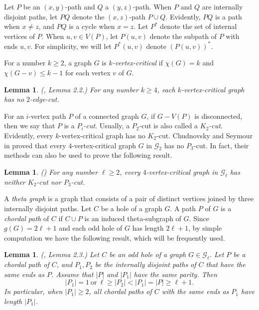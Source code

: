 \documentclass[11pt]{article}
\newtheorem{lemma}[theorem]{Lemma}
\begin{document}
Let $P$ be an $(x,y)$-path and $Q$ a $(y,z)$-path.
When $P$ and $Q$ are internally disjoint paths, %
let $PQ$ denote the $(x,z)$-path $P\cup Q$. Evidently, $PQ$ is a path when $x\neq z$, and $PQ$ is a cycle when $x=z$.
Let $P^*$ denote the set of internal vertices of $P$. When $u,v\in V(P)$, let $P(u,v)$ denote the subpath of $P$ with ends $u, v$. For simplicity, we will let $P^*(u,v)$ denote $(P(u,v))^*$.

For a number $k\geq2$, a graph $G$ is {\em $k$-vertex-critical} if $\chi(G)=k$ and $\chi(G-v)\leq k-1$ for each vertex $v$ of $G$.

\begin{lemma}\label{2-edge-cut}(\cite{CZ22}, Lemma 2.2.)
For any number $k\geq4$, each $k$-vertex-critical graph has no $2$-edge-cut.
\end{lemma}

For an $i$-vertex path $P$ of a connected graph $G$, if $G-V(P)$ is disconnected, then we say that $P$ is a {\em $P_i$-cut}. Usually, a $P_2$-cut is also called a {\em $K_2$-cut}. Evidently, every $k$-vertex-critical graph has no $K_2$-cut. Chudnovsky and Seymour in \cite{MC22} proved that every $4$-vertex-critical graph $G$ in $\mathcal{G}_2$ has no $P_3$-cut. In fact, their methods can also be used to prove the following result.

\begin{lemma}\label{P3}(\cite{MC22})
For any number $\ell\geq2$, every $4$-vertex-critical graph in $\mathcal{G}_{\ell}$ has neither $K_2$-cut nor $P_3$-cut.
\end{lemma}

A {\em theta graph} is a graph that consists of a pair of distinct vertices joined by three internally disjoint paths. Let $C$ be a hole of a graph $G$. A path $P$ of $G$ is a {\em chordal path} of $C$ if $C\cup P$ is an induced theta-subgraph of $G$. Since $g(G)=2\ell+1$ and each odd hole of $G$ has length $2\ell+1$, by simple computation we have the following result, which will be frequently used.

\begin{lemma}\label{easy case}(\cite{CZ22}, Lemma 2.3.)
Let $C$ be an odd hole of a graph $G\in \mathcal{G}_{\ell}$. Let $P$ be a chordal path of $C$, and $P_1,P_2$ be the internally disjoint paths of $C$ that have the same ends as $P$. Assume that $|P|$ and $|P_1|$ have the same parity. Then $$|P_1|=1\ \text{or}\ \ell\geq|P_2|< |P_1|=|P|\geq \ell+1.$$ In particular, when $|P_1|\geq2$, all chordal paths of $C$ with the same ends as $P_1$ have length $|P_1|$.
\end{lemma}
\end{document}
